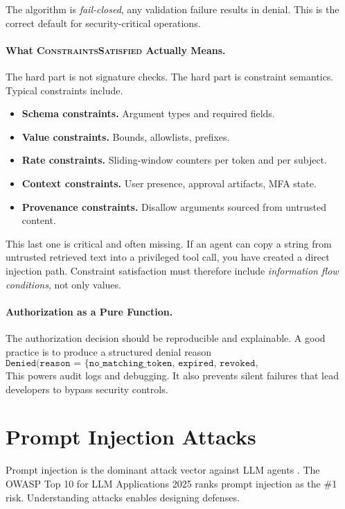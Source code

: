 The algorithm is \textit{fail-closed}, any validation failure results in denial. This is the correct default for security-critical operations.

\paragraph{What \textsc{ConstraintsSatisfied} Actually Means.}
The hard part is not signature checks. The hard part is constraint semantics. Typical constraints include.
\begin{itemize}
\item \textbf{Schema constraints.} Argument types and required fields.
\item \textbf{Value constraints.} Bounds, allowlists, prefixes.
\item \textbf{Rate constraints.} Sliding-window counters per token and per subject.
\item \textbf{Context constraints.} User presence, approval artifacts, MFA state.
\item \textbf{Provenance constraints.} Disallow arguments sourced from untrusted content.
\end{itemize}

This last one is critical and often missing. If an agent can copy a string from untrusted retrieved text into a privileged tool call, you have created a direct injection path. Constraint satisfaction must therefore include \emph{information flow conditions}, not only values.

\paragraph{Authorization as a Pure Function.}
The authorization decision should be reproducible and explainable. A good practice is to produce a structured denial reason
\[
\texttt{Denied(reason = \{no\_matching\_token, expired, revoked, constraint\_violation, rate\_limit\})}
\]
This powers audit logs and debugging. It also prevents silent failures that lead developers to bypass security controls.

\section{Prompt Injection Attacks}

Prompt injection is the dominant attack vector against LLM agents \cite{owasp2025}. The OWASP Top 10 for LLM Applications 2025 ranks prompt injection as the \#1 risk. Understanding attacks enables designing defenses.

